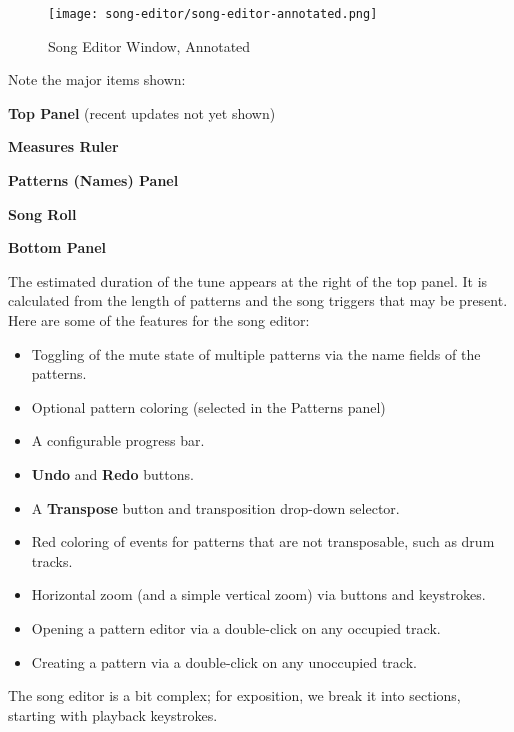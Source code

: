 \begin{figure}[H]
   \centering 
   \texttt{[image: song-editor/song-editor-annotated.png]}
   \caption{Song Editor Window, Annotated}
   \label{fig:song_editor_window_annotated}
\end{figure}

   Note the major items shown:

   \begin{enumber}
      \item \textbf{Top Panel} (recent updates not yet shown)
      \item \textbf{Measures Ruler}
      \item \textbf{Patterns (Names) Panel}
      \item \textbf{Song Roll}
      \item \textbf{Bottom Panel}
   \end{enumber}

   The estimated duration of the tune appears at the right of the top panel.
   It is calculated from the length of patterns
   and the song triggers that may be present.
   Here are some of the features for the song editor:

   \begin{itemize}
      \item Toggling of the mute state of multiple patterns
         via the name fields of the patterns.
      \item Optional pattern coloring (selected in the Patterns panel)
      \item A configurable progress bar.
      \item \textbf{Undo} and \textbf{Redo} buttons.
      \item A \textbf{Transpose} button and transposition drop-down selector.
      \item Red coloring of events for patterns that are not transposable,
         such as drum tracks.
      \item Horizontal zoom (and a simple vertical zoom)
      via buttons and keystrokes.
      \item Opening a pattern editor via a double-click on any occupied
         track.
      \item Creating a pattern via a double-click on any unoccupied track.
   \end{itemize}

   The song editor is a bit complex; for exposition, we break it into
   sections, starting with playback keystrokes.

